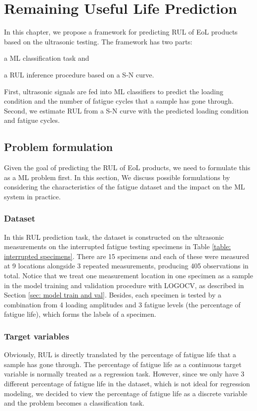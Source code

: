 \chapter{Remaining Useful Life Prediction}
\label{chap: rul}

In this chapter, we propose a framework for predicting RUL of EoL products based on the ultrasonic testing. The framework has two parts: \begin{enumerate*}[label=\itshape\alph*\upshape)]
    \item a ML classification task and
    \item a RUL inference procedure based on a S-N curve.
\end{enumerate*}  First, ultrasonic signals are fed into ML classifiers to predict the loading condition and the number of fatigue cycles that a sample has gone through. Second, we estimate RUL from a S-N curve with the predicted loading condition and fatigue cycles.

\section{Problem formulation}
\label{sec: rul prob formulation}
Given the goal of predicting the RUL of EoL products, we need to formulate this as a ML problem first. In this section, We discuss possible formulations by considering the characteristics of the fatigue dataset and the impact on the ML system in practice.

\subsection{Dataset}
In this RUL prediction task, the dataset is constructed on the ultrasonic measurements on the interrupted fatigue testing specimens in Table \ref{table: interrupted specimens}. There are 15 specimens and each of these were measured at 9 locations alongside 3 repeated measurements, producing 405 observations in total. Notice that we treat one measurement location in one specimen as a sample in the model training and validation procedure with LOGOCV, as described in Section \ref{sec: model train and val}. Besides, each specimen is tested by a combination from 4 loading amplitudes and 3 fatigue levels (the percentage of fatigue life), which forms the labels of a specimen.

\subsection{Target variables}
Obviously, RUL is directly translated by the percentage of fatigue life that a sample has gone through. The percentage of fatigue life as a continuous target variable is normally treated as a regression task. However, since we only have 3 different percentage of fatigue life in the dataset, which is not ideal for regression modeling, we decided to view the percentage of fatigue life as a discrete variable and the problem becomes a classification task.

